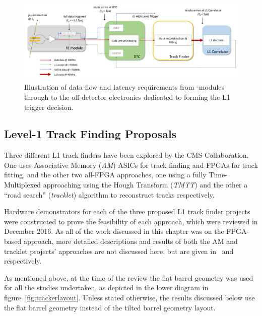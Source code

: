 \begin{figure}[tb]
\centering
\includegraphics[width=\textwidth]{figs/tk-upgrade/dataflow.pdf}
\caption{Illustration of data-flow and latency requirements from \pt-modules through to the off-detector electronics dedicated to forming the L1 trigger decision.}
\label{fig:dataFlow}
\end{figure}

\subsection{Level-1 Track Finding Proposals}\label{subsec:TrackFinderReview}

Three different L1 track finders have been explored by the CMS Collaboration.
One uses Associative Memory (\emph{AM}) ASICs for track finding and FPGAs for track fitting, and the other two all-FPGA approaches, one using a fully Time-Multiplexed approaching using the Hough Transform (\emph{TMTT}) and the other a ``road search'' (\emph{tracklet}) algorithm to reconstruct tracks respectively.

Hardware demonstrators for each of the three proposed L1 track finder projects were constructed to prove the feasibility of each approach, which were reviewed in December 2016.
As all of the work discussed in this chapter was on the FPGA-based \HT approach, more detailed descriptions and results of both the AM and tracklet projects' approaches are not discussed here, but are given in~\cite{AM,P2TrackerTDR} and~\cite{tracklet,P2TrackerTDR} respectively.

As mentioned above, at the time of the review the flat barrel geometry was used for all the studies undertaken, as depicted in the lower diagram in figure~\ref{fig:trackerlayout}.
Unless stated otherwise, the results discussed below use the flat barrel geometry instead of the tilted barrel geometry layout.

